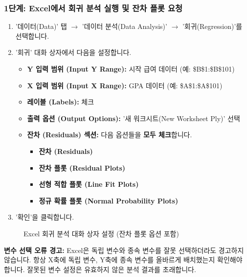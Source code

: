\documentclass[11pt,a4paper]{article}
\theoremstyle{definition}
\begin{document}
\subsubsection{1단계: Excel에서 회귀 분석 실행 및 잔차 플롯 요청}
\begin{enumerate}
    \item '데이터(Data)' 탭 $\rightarrow$ '데이터 분석(Data Analysis)' $\rightarrow$ '회귀(Regression)'를 선택합니다.
    \item '회귀' 대화 상자에서 다음을 설정합니다.
    \begin{itemize}
        \item \textbf{Y 입력 범위 (Input Y Range):} 시작 급여 데이터 (예: \$B\$1:\$B\$101)
        \item \textbf{X 입력 범위 (Input X Range):} GPA 데이터 (예: \$A\$1:\$A\$101)
        \item \textbf{레이블 (Labels):} 체크
        \item \textbf{출력 옵션 (Output Options):} '새 워크시트(New Worksheet Ply)' 선택
        \item \textbf{잔차 (Residuals) 섹션:} 다음 옵션들을 \textbf{모두 체크}합니다.
        \begin{itemize}
            \item \textbf{잔차 (Residuals)}
            \item \textbf{잔차 플롯 (Residual Plots)}
            \item \textbf{선형 적합 플롯 (Line Fit Plots)}
            \item \textbf{정규 확률 플롯 (Normal Probability Plots)}
        \end{itemize}
    \end{itemize}
    \item '확인'을 클릭합니다.
\end{enumerate}

\begin{figure}[h!]
    \centering
    \caption{Excel 회귀 분석 대화 상자 설정 (잔차 플롯 옵션 포함)}
    \label{fig:gpa_salary_regression_dialog}
\end{figure}

\begin{cautionbox}
\textbf{변수 선택 오류 경고:}
Excel은 독립 변수와 종속 변수를 잘못 선택하더라도 경고하지 않습니다. 항상 X축에 독립 변수, Y축에 종속 변수를 올바르게 배치했는지 확인해야 합니다. 잘못된 변수 설정은 유효하지 않은 분석 결과를 초래합니다.
\end{cautionbox}
\end{document}
